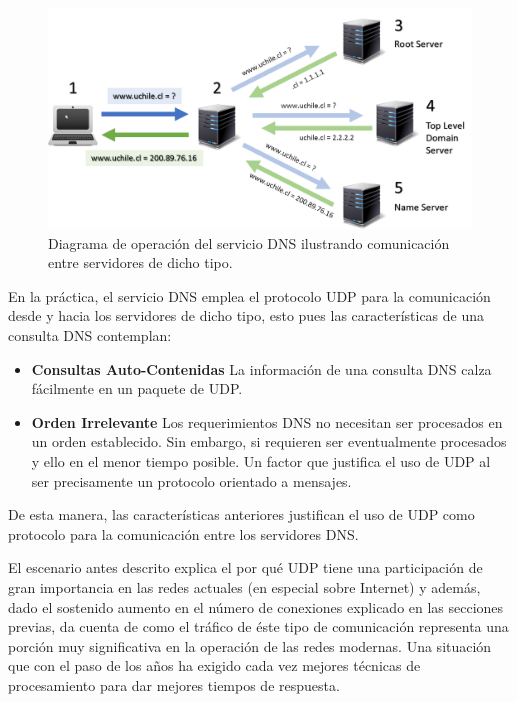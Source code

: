 \begin{figure}[!h]
	\centering
	\includegraphics[scale=0.7]{imagenes/dns-system}
	\caption{Diagrama de operación del servicio DNS ilustrando comunicación entre servidores de dicho tipo.}
	\label{fig:dns}
\end{figure}

En la práctica, el servicio DNS emplea el protocolo UDP para la comunicación desde y hacia los servidores de dicho tipo, esto pues las características de una consulta DNS contemplan:

\begin{itemize}
\item \textbf{Consultas Auto-Contenidas} La información de una consulta DNS calza fácilmente en un paquete de UDP.
\item \textbf{Orden Irrelevante} Los requerimientos DNS no necesitan ser procesados en un orden establecido. Sin embargo, si requieren ser eventualmente procesados y ello en el menor tiempo posible. Un factor que justifica el uso de UDP al ser precisamente un protocolo orientado a mensajes.
\end{itemize}

De esta manera, las características anteriores justifican el uso de UDP como protocolo para la comunicación entre los servidores DNS.

El escenario antes descrito explica el por qué UDP tiene una participación de gran importancia en las redes actuales (en especial sobre Internet) y además, dado el sostenido aumento en el número de conexiones explicado en las secciones previas, da cuenta de como el tráfico de éste tipo de comunicación representa una porción muy significativa en la operación de las redes modernas. Una situación que con el paso de los años ha exigido cada vez mejores técnicas de procesamiento para dar mejores tiempos de respuesta.

